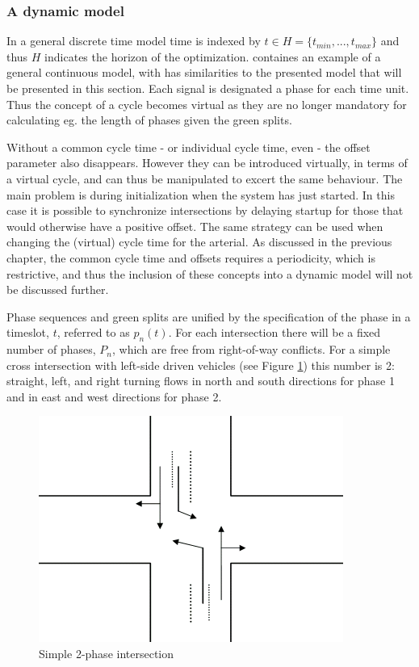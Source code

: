\subsubsection*{A dynamic model}
\label{sec:dynamicmodel}

In a general discrete time model time is indexed by $t \in H = \lbrace
t_{min},...,t_{max} \rbrace$ and thus $H$ indicates the horizon of the
optimization. \cite{36} containes an example of a general
continuous model, with has similarities to the presented model that
will be presented in this section. Each signal is designated a phase
for each time unit. Thus the concept of a cycle becomes virtual as
they are no longer mandatory for calculating eg. the length of phases
given the green splits.

Without a common cycle time - or individual cycle time, even - the
offset parameter also disappears. However they can be introduced
virtually, in terms of a virtual cycle, and can thus be manipulated to
excert the same behaviour.  The main problem is during initialization
when the system has just started. In this case it is possible to
synchronize intersections by delaying startup for those that would
otherwise have a positive offset. The same strategy can be used when
changing the (virtual) cycle time for the arterial. As discussed in
the previous chapter, the common cycle time and offsets requires a
periodicity, which is restrictive, and thus the inclusion of these
concepts into a dynamic model will not be discussed further.

Phase sequences and green splits are unified by the specification of the phase in a timeslot, $t$, referred to as $p_n(t)$. For each intersection there will be a fixed number of phases, $P_n$, which are free from right-of-way conflicts. For a simple cross intersection with left-side driven vehicles (see Figure \ref{fig:simple_intersection}) this number is 2: straight, left, and right turning flows in north and south directions for phase 1 and in east and west directions for phase 2.

\begin{figure}[!ht]
\begin{center}
\includegraphics[scale=0.4]{simple_intersection.png} 
\end{center}
\caption{Simple 2-phase intersection}
\label{fig:simple_intersection}
\end{figure}

